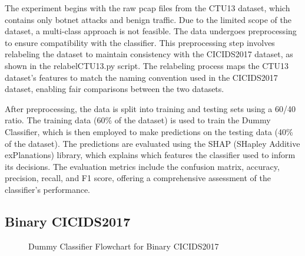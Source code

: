 The experiment begins with the raw pcap files from the CTU13 dataset, which contains only botnet attacks and benign traffic. Due to the limited scope of the dataset, a multi-class approach is not feasible. The data undergoes preprocessing to ensure compatibility with the classifier. This preprocessing step involves relabeling the dataset to maintain consistency with the CICIDS2017 dataset, as shown in the relabelCTU13.py script. The relabeling process maps the CTU13 dataset's features to match the naming convention used in the CICIDS2017 dataset, enabling fair comparisons between the two datasets.

After preprocessing, the data is split into training and testing sets using a 60/40 ratio. The training data (60\% of the dataset) is used to train the Dummy Classifier, which is then employed to make predictions on the testing data (40\% of the dataset). The predictions are evaluated using the SHAP (SHapley Additive exPlanations) library, which explains which features the classifier used to inform its decisions. The evaluation metrics include the confusion matrix, accuracy, precision, recall, and F1 score, offering a comprehensive assessment of the classifier's performance.

\subsection{Binary CICIDS2017}

\begin{figure}[H]
\centering
{}
\caption{Dummy Classifier Flowchart for Binary CICIDS2017}\label{fig:DummyRandomFlowBinaryCICIDS2017}
\end{figure}

